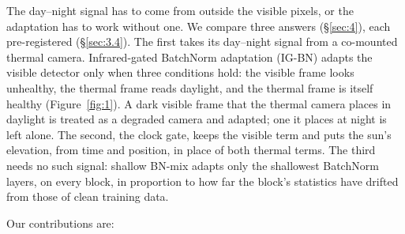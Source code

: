 \documentclass[10pt]{article}
\begin{document}
The day--night signal has to come from outside the visible pixels, or the adaptation has to work without one. We compare three answers (\S\ref{sec:4}), each pre-registered (\S\ref{sec:3.4}). The first takes its day--night signal from a co-mounted thermal camera. Infrared-gated BatchNorm adaptation (IG-BN) adapts the visible detector only when three conditions hold: the visible frame looks unhealthy, the thermal frame reads daylight, and the thermal frame is itself healthy (Figure~\ref{fig:1}). A dark visible frame that the thermal camera places in daylight is treated as a degraded camera and adapted; one it places at night is left alone. The second, the clock gate, keeps the visible term and puts the sun's elevation, from time and position, in place of both thermal terms. The third needs no such signal: shallow BN-mix adapts only the shallowest BatchNorm layers, on every block, in proportion to how far the block's statistics have drifted from those of clean training data.

Our contributions are:
\end{document}

